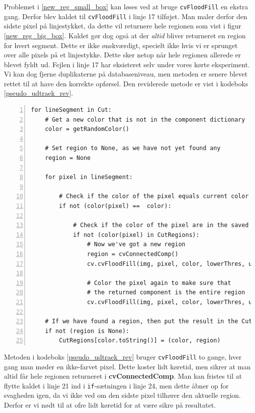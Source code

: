 {Problemet i \ref{new_reg_small_box} kan løses ved at bruge
\texttt{cvFloodFill} en ekstra gang. Derfor blev kaldet til
\texttt{cvFloodFill} i linje 17 tilføjet. Man maler derfor den sidste
pixel på linjestykket, da dette vil returnere hele regionen som vist i
figur \ref{new_reg_big_box}. Kaldet gør dog også at der \emph{altid}
bliver returneret en region for hvert segment. Dette er ikke
ønskværdigt, specielt ikke hvis vi er sprunget over alle pixels på et
linjestykke. Dette sker netop når hele regionen allerede er blevet fyldt
ud. Fejlen i linje 17 har eksisteret selv under vores kørte eksperiment.
Vi kan dog fjerne duplikaterne på databaseniveau, men metoden er senere
blevet rettet til at have den korrekte opførsel. Den reviderede metode
er vist i kodeboks \ref{pseudo_udtraek_rev}.

\begin{lstlisting}[caption={Revideret pseudokode til udtrækning af
    regioner. Returnerer ingen
    duplikater.},captionpos=b,label={pseudo_udtraek_rev},numbers=left,
    frame=single, breaklines=false, float=p]
for lineSegment in Cut:
    # Get a new color that is not in the component dictionary
    color = getRandomColor()

    # Set region to None, as we have not yet found any
    region = None

    for pixel in lineSegment:

        # Check if the color of the pixel equals current color
        if not (color(pixel) ==  color):

            # Check if the color of the pixel are in the saved regions
            if not (color(pixel) in CutRegions):
                # Now we've got a new region
                region = cvConnectedComp()
                cv.cvFloodFill(img, pixel, color, lowerThres, upperThres, region)

                # Color the pixel again to make sure that
                # the returned component is the entire region
                cv.cvFloodFill(img, pixel, color, lowerThres, upperThres, region)

    # If we have found a region, then put the result in the CutRegions-dictionary
    if not (region is None):
        CutRegions[color.toString()] = (color, region)
\end{lstlisting}

Metoden i kodeboks \ref{pseudo_udtraek_rev} bruger \texttt{cvFloodFill}
to gange, hver gang man møder en ikke-farvet pixel. Dette koster lidt
køretid, men sikrer at man altid får hele regionen returneret i
\textbf{cvConnectedComp}. Man kan fristes til at flytte kaldet i linje 21 ind
i \texttt{if}-sætningen i linje 24, men dette åbner op for svagheden
igen, da vi ikke ved om den sidste pixel tilhører den aktuelle region.
Derfor er vi nødt til at ofre lidt køretid for at være sikre på
resultatet.

}
